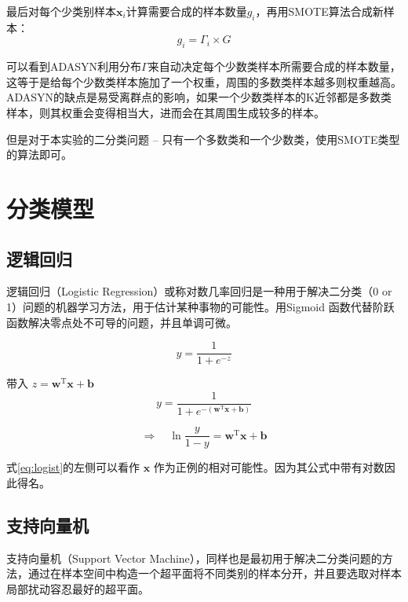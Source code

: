 \documentclass[a4paper]{article}
\begin{document}
最后对每个少类别样本\(\mathbf{x}_i\)计算需要合成的样本数量\(g_i\)，再用SMOTE算法合成新样本：
\[ g_i = \Gamma_i \times G \]



可以看到ADASYN利用分布\(\Gamma\)来自动决定每个少数类样本所需要合成的样本数量，这等于是给每个少数类样本施加了一个权重，周围的多数类样本越多则权重越高。ADASYN的缺点是易受离群点的影响，如果一个少数类样本的K近邻都是多数类样本，则其权重会变得相当大，进而会在其周围生成较多的样本。

但是对于本实验的二分类问题 -- 只有一个多数类和一个少数类，使用SMOTE类型的算法即可。

\section{分类模型}

\subsection{逻辑回归}
逻辑回归（Logistic Regression）或称对数几率回归是一种用于解决二分类（0 or 1）问题的机器学习方法，用于估计某种事物的可能性。用Sigmoid 函数代替阶跃函数解决零点处不可导的问题，并且单调可微。

\begin{equation*}
    y = \frac{1}{1+ e^{-z}}
\end{equation*}

带入 $z = \bm{w} ^\mathrm{T} \bm{x}+\bm{b}$ 
\begin{equation*}
        y = \frac{1}{1+ e^{-(\bm{w} ^\mathrm{T} \bm{x}+\bm{b})}}
\end{equation*}

\begin{equation}
    \Longrightarrow  \quad 
    \ln \frac{y}{1-y} = \bm{w} ^\mathrm{T} \bm{x}+\bm{b}
    \label{eq:logist}
\end{equation}

式\ref{eq:logist}的左侧可以看作 $\bm{x}$ 作为正例的相对可能性。因为其公式中带有对数因此得名。

\subsection{支持向量机}
支持向量机（Support Vector Machine），同样也是最初用于解决二分类问题的方法，通过在样本空间中构造一个超平面将不同类别的样本分开，并且要选取对样本局部扰动容忍最好的超平面。
\end{document}
